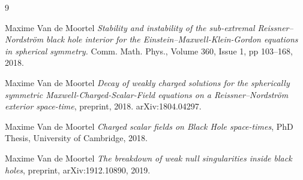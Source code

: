 \documentclass[10pt,a4paper]{article}
\theoremstyle{plain}
\theoremstyle{remark}
\theoremstyle{definition}
\theoremstyle{plain}
\theoremstyle{remark}
\theoremstyle{definition}
\numberwithin{equation}{section}
\begin{document}
\begin{thebibliography}{9}
	
	
	
	
	
	
	
	
	
	
	
	
	
	
	
	
	
	
	
	
	
	
	
	
	  Maxime Van de Moortel \emph{Stability and instability of the sub-extremal Reissner--Nordström black hole interior for
		the Einstein--Maxwell-Klein-Gordon equations in spherical symmetry.}		Comm. Math. Phys., Volume 360, Issue 1, pp 103–168, 2018.
	
	  Maxime Van de Moortel \emph{Decay of weakly charged solutions for the spherically symmetric Maxwell-Charged-Scalar-Field equations on a Reissner--Nordstr\"{o}m exterior space-time}, preprint, 2018. arXiv:1804.04297.
	
	  Maxime Van de Moortel \emph{Charged scalar fields on Black Hole
		space-times}, PhD Thesis, University of Cambridge, 2018.
	
	  Maxime Van de Moortel \emph{The breakdown of weak null singularities inside black holes}, preprint, arXiv:1912.10890, 2019.
	
\end{thebibliography}
\end{document}
